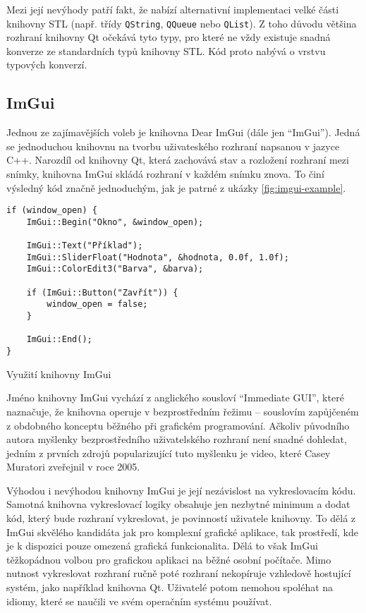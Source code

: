 
Mezi její nevýhody patří fakt, že nabízí alternativní implementaci velké části knihovny STL (např. třídy \texttt{QString}, \texttt{QQueue} nebo \texttt{QList}). Z toho důvodu většina rozhraní knihovny Qt očekává tyto typy, pro které ne vždy existuje snadná konverze ze standardních typů knihovny STL. Kód proto nabývá o vrstvu typových konverzí.

\subsection{ImGui}

Jednou ze zajímavějších voleb je knihovna Dear ImGui\cite{github-imgui} (dále jen ``ImGui''). Jedná se jednoduchou knihovnu na tvorbu uživateského rozhraní napsanou v jazyce C++. Narozdíl od knihovny Qt, která zachovává stav a rozložení rozhraní mezi snímky, knihovna ImGui skládá rozhraní v každém snímku znova. To činí výsledný kód značně jednoduchým, jak je patrné z ukázky \ref{fig:imgui-example}.

\begin{listing}
\begin{verbatim}
if (window_open) {
    ImGui::Begin("Okno", &window_open);

    ImGui::Text("Příklad");
    ImGui::SliderFloat("Hodnota", &hodnota, 0.0f, 1.0f);
    ImGui::ColorEdit3("Barva", &barva);
    
    if (ImGui::Button("Zavřít")) {
        window_open = false;
    }

    ImGui::End();
}
\end{verbatim}
\caption{Využití knihovny ImGui}
\label{fig:imgui-example}
\end{listing}

Jméno knihovny ImGui vychází z anglického sousloví ``Immediate GUI'', které naznačuje, že knihovna operuje v bezprostředním řežimu -- souslovím zapůjčeném z obdobného konceptu běžného při grafickém programování. Ačkoliv původního autora myšlenky bezprostředního uživatelského rozhraní není snadné dohledat, jedním z prvních zdrojů popularizující tuto myšlenku je video, které Casey Muratori zveřejnil v roce 2005\cite{casey-imgui}.


Výhodou i nevýhodou knihovny ImGui je její nezávislost na vykreslovacím kódu. Samotná knihovna vykreslovací logiky obsahuje jen nezbytné minimum a dodat kód, který bude rozhraní vykreslovat, je povinností uživatele knihovny. To dělá z ImGui skvělého kandidáta jak pro komplexní grafické aplikace, tak prostředí, kde je k dispozici pouze omezená grafická funkcionalita. Dělá to však ImGui těžkopádnou volbou pro grafickou aplikaci na běžné osobní počítače. Mimo nutnost vykreslovat rozhraní ručně poté rozhraní nekopíruje vzhledově hostující systém, jako například knihovna Qt. Uživatelé potom nemohou spoléhat na idiomy, které se naučili ve svém operačním systému používat.

